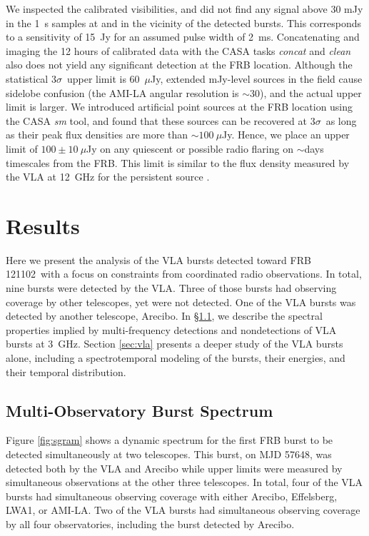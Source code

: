 \documentclass[twocolumn]{aastex61}
\newcommand{\frb}{FRB 121102}
\begin{document}
We inspected the calibrated visibilities, and did not find any signal above 30 mJy in the 1~s samples at and in the vicinity of the detected bursts. This corresponds to a sensitivity of 15~Jy for an assumed pulse width of 2~ms. Concatenating and imaging the 12 hours of calibrated data with the CASA tasks {\it concat} and {\it clean} also does not yield any significant detection at the FRB location. Although the statistical $3\sigma$\ upper limit is 60~$\mu$Jy, extended mJy-level sources in the field cause sidelobe confusion (the AMI-LA angular resolution is $\sim$30\arcsec), and the actual upper limit is larger. We introduced artificial point sources at the FRB location using the CASA {\it sm} tool, and found that these sources can be recovered at $3\sigma$\ as long as their peak flux densities are more than $\sim100~\mu$Jy. Hence, we place an upper limit of $100\pm10~\mu$Jy on any quiescent or possible radio flaring on $\sim$days timescales from the FRB. This limit is similar to the flux density measured by the VLA at 12~GHz for the persistent source \citep{LOC}.

\section{Results}
\label{sec:res}

Here we present the analysis of the VLA bursts detected toward \frb\ with a focus on constraints from coordinated radio observations. In total, nine bursts were detected by the VLA. Three of those bursts had observing coverage by other telescopes, yet were not detected. One of the VLA bursts was detected by another telescope, Arecibo. In \S \ref{sec:vlaao}, we describe the spectral properties implied by multi-frequency detections and nondetections of VLA bursts at 3~GHz. Section \ref{sec:vla} presents a deeper study of the VLA bursts alone, including a spectrotemporal modeling of the bursts, their energies, and their temporal distribution.

\subsection{Multi-Observatory Burst Spectrum}
\label{sec:vlaao}

Figure \ref{fig:sgram} shows a dynamic spectrum for the first FRB burst to be detected simultaneously at two telescopes. This burst, on MJD 57648, was detected both by the VLA and Arecibo while upper limits were measured by simultaneous observations at the other three telescopes. In total, four of the VLA bursts had simultaneous observing coverage with either Arecibo, Effelsberg, LWA1, or AMI-LA. Two of the VLA bursts had simultaneous observing coverage by all four observatories, including the burst detected by Arecibo.
\end{document}
